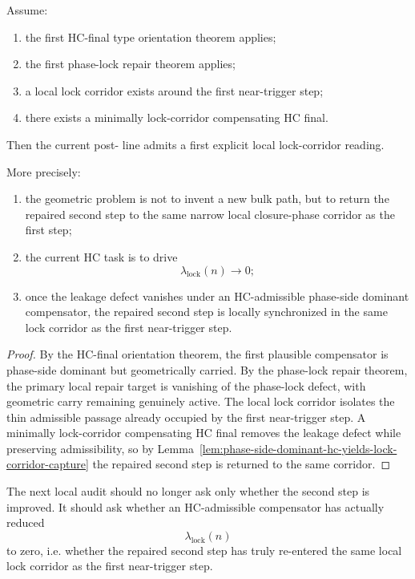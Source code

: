 \begin{theorem}
\label{thm:first-explicit-lock-corridor-theorem}
Assume:
\begin{enumerate}[leftmargin=2em,label=(\alph*)]
 \item the first HC-final type orientation theorem applies;
 \item the first phase-lock repair theorem applies;
 \item a local lock corridor exists around the first near-trigger step;
 \item there exists a minimally lock-corridor compensating HC final.
\end{enumerate}
Then the current post- line admits a first explicit local lock-corridor reading.

More precisely:
\begin{enumerate}[leftmargin=2em,label=(\roman*)]
 \item the geometric problem is not to invent a new bulk path, but to return the repaired second step to the same narrow local closure-phase corridor as the first step;
 \item the current HC task is to drive
 \[
 \lambda_{\mathrm{lock}}(n)\to 0;
 \]
 \item once the leakage defect vanishes under an HC-admissible phase-side dominant compensator, the repaired second step is locally synchronized in the same lock corridor as the first near-trigger step.
\end{enumerate}
\end{theorem}

\begin{proof}
By the HC-final orientation theorem, the first plausible compensator is phase-side dominant but geometrically carried. By the phase-lock repair theorem, the primary local repair target is vanishing of the phase-lock defect, with geometric carry remaining genuinely active. The local lock corridor isolates the thin admissible passage already occupied by the first near-trigger step. A minimally lock-corridor compensating HC final removes the leakage defect while preserving admissibility, so by Lemma~\ref{lem:phase-side-dominant-hc-yields-lock-corridor-capture} the repaired second step is returned to the same corridor.
\end{proof}

\begin{corollary}
\label{cor:current-lock-corridor-working-rule}
The next local audit should no longer ask only whether the second step is improved. It should ask whether an HC-admissible compensator has actually reduced
\[
 \lambda_{\mathrm{lock}}(n)
\]
to zero, i.e. whether the repaired second step has truly re-entered the same local lock corridor as the first near-trigger step.
\end{corollary}

